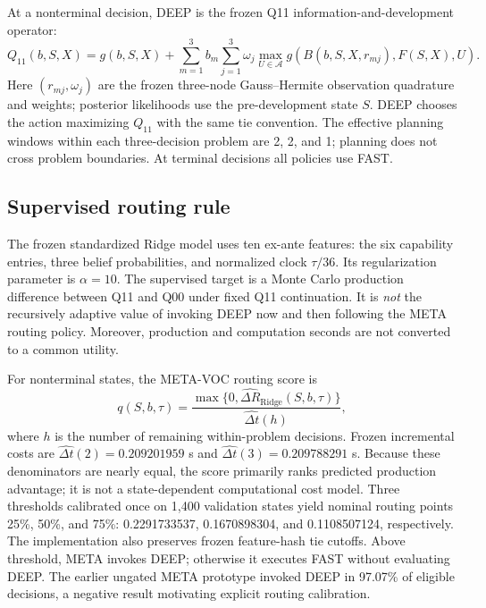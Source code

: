 \documentclass[11pt]{article}
\begin{document}
At a nonterminal decision, DEEP is the frozen Q11 information-and-development operator:
\begin{equation}
Q_{11}(b,S,X)=g(b,S,X)+\sum_{m=1}^3 b_m\sum_{j=1}^3\omega_j\max_{U\in\mathcal A}g\!\left(B(b,S,X,r_{mj}),F(S,X),U\right).
\end{equation}
Here $(r_{mj},\omega_j)$ are the frozen three-node Gauss--Hermite observation quadrature and weights; posterior likelihoods use the pre-development state $S$. DEEP chooses the action maximizing $Q_{11}$ with the same tie convention. The effective planning windows within each three-decision problem are 2, 2, and 1; planning does not cross problem boundaries. At terminal decisions all policies use FAST.

\subsection{Supervised routing rule}
The frozen standardized Ridge model uses ten ex-ante features: the six capability entries, three belief probabilities, and normalized clock $\tau/36$. Its regularization parameter is $\alpha=10$. The supervised target is a Monte Carlo production difference between Q11 and Q00 under fixed Q11 continuation. It is \emph{not} the recursively adaptive value of invoking DEEP now and then following the META routing policy. Moreover, production and computation seconds are not converted to a common utility.

For nonterminal states, the META-VOC routing score is
\begin{equation}
q(S,b,\tau)=\frac{\max\{0,\widehat{\Delta R}_{\mathrm{Ridge}}(S,b,\tau)\}}{\widehat{\Delta t}(h)},
\end{equation}
where $h$ is the number of remaining within-problem decisions. Frozen incremental costs are $\widehat{\Delta t}(2)=0.209201959$ s and $\widehat{\Delta t}(3)=0.209788291$ s. Because these denominators are nearly equal, the score primarily ranks predicted production advantage; it is not a state-dependent computational cost model. Three thresholds calibrated once on 1,400 validation states yield nominal routing points 25\%, 50\%, and 75\%: 0.2291733537, 0.1670898304, and 0.1108507124, respectively. The implementation also preserves frozen feature-hash tie cutoffs. Above threshold, META invokes DEEP; otherwise it executes FAST without evaluating DEEP. The earlier ungated META prototype invoked DEEP in 97.07\% of eligible decisions, a negative result motivating explicit routing calibration.
\end{document}
